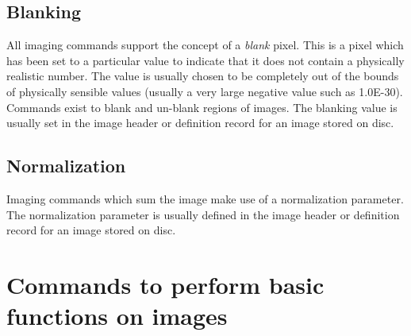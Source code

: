 \subsection{Blanking}
All imaging commands support the concept of a {\it blank} pixel.  This is
a pixel which has been set to a particular value to indicate that it does
not contain a physically realistic number.  The value is usually chosen to
be completely out of the bounds of physically sensible values (usually
a very large negative value such as 1.0E-30).  Commands exist to blank
and un-blank regions of images.  The blanking value is usually set in the
image header or definition record for an image stored on disc.

\subsection{Normalization}
Imaging commands which sum the image make use of a normalization parameter.
The normalization parameter is usually defined in the
image header or definition record for an image stored on disc.

\section{Commands to perform basic functions on images}

